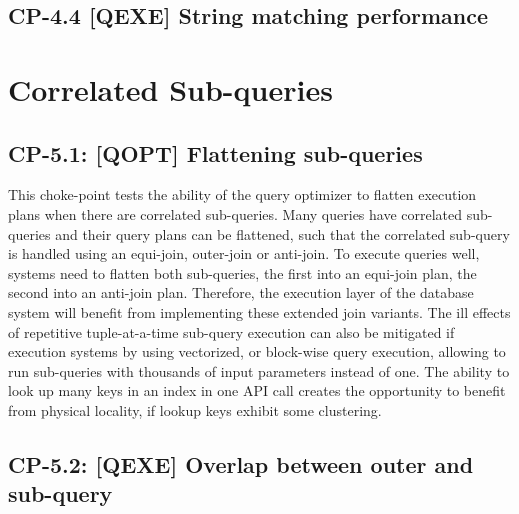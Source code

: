 

\subsection*{CP-4.4 [QEXE] String matching performance}




%


\section{Correlated Sub-queries}

\subsection*{CP-5.1: [QOPT] Flattening sub-queries}
\label{choke_point_5.1}


This choke-point tests the ability of the query optimizer to flatten execution plans when there are correlated sub-queries. Many queries have correlated sub-queries and their query plans can be flattened,
such that the correlated sub-query is handled using an equi-join, outer-join or anti-join. To execute queries well, systems need to flatten both sub-queries, the first into an equi-join plan, the second into an anti-join plan.
Therefore, the execution layer of the database system will benefit from implementing these extended join variants.
The ill effects of repetitive tuple-at-a-time sub-query execution can also be mitigated if execution systems by using vectorized, or block-wise query execution, allowing to run sub-queries with thousands of input parameters instead of one.
The ability to look up many keys in an index in one API call creates the opportunity to benefit from physical locality, if lookup keys exhibit some clustering.



\subsection*{CP-5.2: [QEXE] Overlap between outer and sub-query}
\label{choke_point_5.2}

